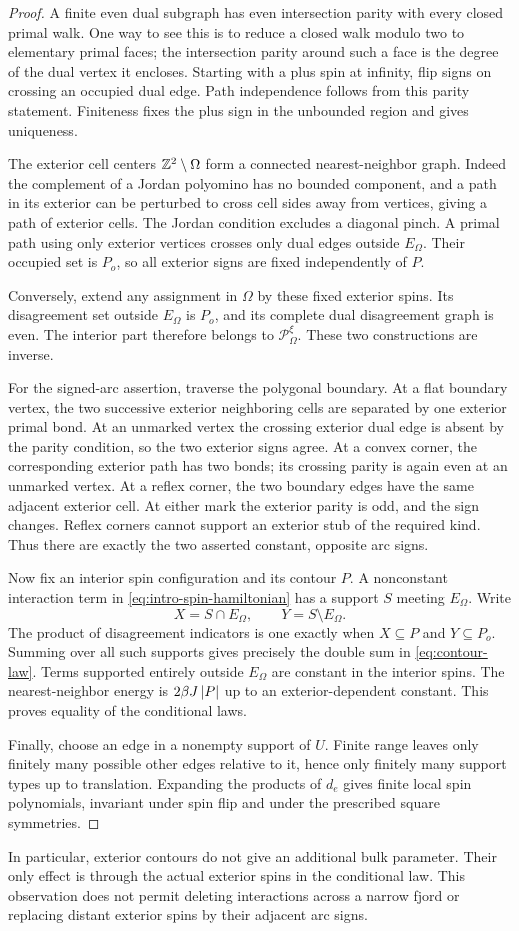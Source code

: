 \begin{proof}
A finite even dual subgraph has even intersection parity with every
closed primal walk. One way to see this is to reduce a closed walk
modulo two to elementary primal faces; the intersection parity around
such a face is the degree of the dual vertex it encloses. Starting with
a plus spin at infinity, flip signs on crossing an occupied dual edge.
Path independence follows from this parity statement. Finiteness fixes
the plus sign in the unbounded region and gives uniqueness.

The exterior cell centers \(\mathbb Z^2\setminus\Omega\) form a connected
nearest-neighbor graph. Indeed the complement of a Jordan polyomino has
no bounded component, and a path in its exterior can be perturbed to
cross cell sides away from vertices, giving a path of exterior cells.
The Jordan condition excludes a diagonal pinch. A primal path using
only exterior vertices crosses only dual edges outside \(E_\Omega\).
Their occupied set is \(P_o\), so all exterior signs are fixed
independently of \(P\).

Conversely, extend any assignment in \(\Omega\) by these fixed exterior
spins. Its disagreement set outside \(E_\Omega\) is \(P_o\), and its
complete dual disagreement graph is even. The interior part therefore
belongs to \(\mathcal P_\Omega^\xi\). These two constructions are inverse.

For the signed-arc assertion, traverse the polygonal boundary. At a
flat boundary vertex, the two successive exterior neighboring cells
are separated by one exterior primal bond. At an unmarked vertex the
crossing exterior dual edge is absent by the parity condition, so the
two exterior signs agree. At a convex corner, the corresponding
exterior path has two bonds; its crossing parity is again even at
an unmarked vertex. At a reflex corner, the two boundary edges have
the same adjacent exterior cell. At either mark the exterior parity
is odd, and the sign changes. Reflex corners cannot support an exterior
stub of the required kind. Thus there are exactly the two asserted
constant, opposite arc signs.

Now fix an interior spin configuration and its contour \(P\).
A nonconstant interaction term in
\eqref{eq:intro-spin-hamiltonian} has a support \(S\) meeting
\(E_\Omega\). Write
\[
 X=S\cap E_\Omega,\qquad Y=S\setminus E_\Omega.
\]
The product of disagreement indicators is one exactly when
\(X\subseteq P\) and \(Y\subseteq P_o\). Summing over all such supports
gives precisely the double sum in \eqref{eq:contour-law}.
Terms supported entirely outside \(E_\Omega\) are constant in the
interior spins. The nearest-neighbor energy is \(2\beta J\left|P\right|\)
up to an exterior-dependent constant. This proves equality of the
conditional laws.

Finally, choose an edge in a nonempty support of \(U\). Finite range
leaves only finitely many possible other edges relative to it, hence
only finitely many support types up to translation. Expanding the
products of \(d_e\) gives finite local spin polynomials, invariant
under spin flip and under the prescribed square symmetries.
\end{proof}

In particular, exterior contours do not give an additional bulk
parameter. Their only effect is through the actual exterior spins
in the conditional law. This observation does not permit deleting
interactions across a narrow fjord or replacing distant exterior
spins by their adjacent arc signs.

